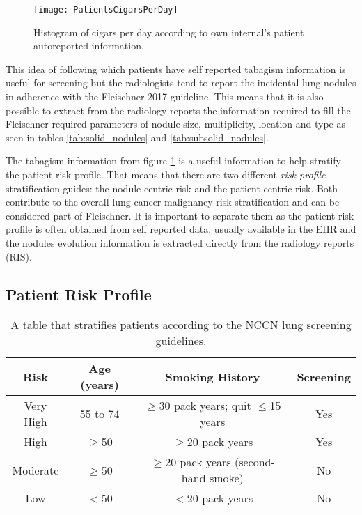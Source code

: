 \begin{center}
\begin{figure}
\begin{centering}
\texttt{[image: PatientsCigarsPerDay]}
\par\end{centering}
\caption{\label{fig:cigars_per_day} Histogram of cigars per day according to \nomeHsl{} own internal's
patient autoreported information.}
\end{figure}
\vspace*{-44pt}
\end{center}

This idea of following which patients have self reported tabagism information is useful for screening but the radiologists tend to report the incidental lung nodules in adherence with the Fleischner 2017 guideline. This means that it is also possible to extract from the radiology reports the information required to fill the Fleischner required parameters of nodule size, multiplicity, location and type as seen in tables \ref{tab:solid_nodules} and \ref{tab:subsolid_nodules}. 

The tabagism information from figure \ref{fig:cigars_per_day} is a useful information to help stratify the patient risk profile. That means that there are two different \emph{risk profile} stratification guides: the nodule-centric risk and the patient-centric risk. Both contribute to the overall lung cancer malignancy risk stratification and can be considered part of Fleischner\cite{fleischner2017}. It is important to separate them as the patient risk profile is often obtained from self reported data, usually available in the EHR and the nodules evolution information is extracted directly from the radiology reports (RIS).

\subsection{Patient Risk Profile}

\begin{table}
\begin{centering}
\begin{tabular}{c|c|c|c}
\hline 
Risk & Age (years) & Smoking History & Screening \tabularnewline
\hline 
Very High & 55 to 74 & $\ge30$ pack years; quit $\le$15 years & Yes \tabularnewline
High & $\ge$50 & $\ge20$ pack years & Yes\tabularnewline 
Moderate & $\ge$50 & $\ge20$ pack years (second-hand smoke) & No \tabularnewline 
Low & $<$50 & $<20$ pack years & No\tabularnewline
\hline 
\end{tabular}
\end{centering}
\caption{\label{tab:nccn_risk_lung_nodule}A table that stratifies patients according to the NCCN lung screening
guidelines.}
\end{table}

